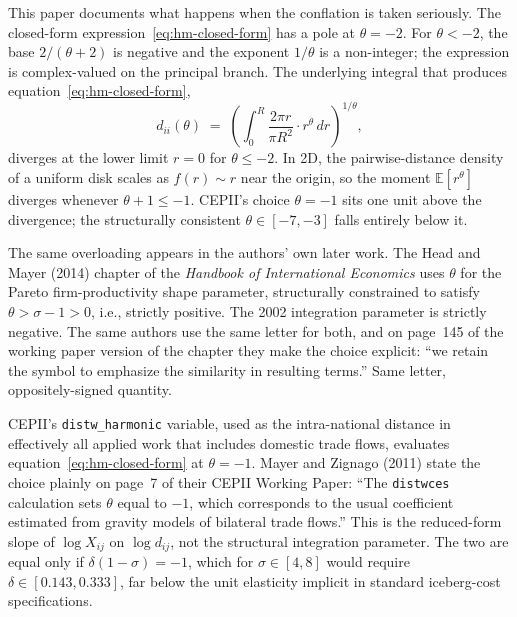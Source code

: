 \documentclass[11pt, letterpaper]{article}
\theoremstyle{definition}
\newcommand{\E}{\mathbb{E}}
\newcommand{\dii}{d_{ii}}
\begin{document}
This paper documents what happens when the conflation is taken
seriously. The closed-form expression~\eqref{eq:hm-closed-form} has a
pole at $\theta = -2$. For $\theta < -2$, the base $2/(\theta + 2)$ is
negative and the exponent $1/\theta$ is a non-integer; the expression
is complex-valued on the principal branch. The underlying integral
that produces equation~\eqref{eq:hm-closed-form},
\begin{equation}
\label{eq:hm-integral}
\dii(\theta) \;=\; \left( \int_0^R \frac{2\pi r}{\pi R^2} \cdot r^{\theta}\, dr \right)^{1/\theta},
\end{equation}
diverges at the lower limit $r = 0$ for $\theta \leq -2$. In 2D, the
pairwise-distance density of a uniform disk scales as $f(r) \sim r$
near the origin, so the moment $\E[r^\theta]$ diverges whenever
$\theta + 1 \leq -1$. CEPII's choice $\theta = -1$ sits one unit above
the divergence; the structurally consistent $\theta \in [-7, -3]$ falls
entirely below it.

The same overloading appears in the authors' own later work. The
Head and Mayer (2014) chapter of the \emph{Handbook of International
Economics} uses $\theta$ for the Pareto firm-productivity shape
parameter, structurally constrained to satisfy $\theta > \sigma - 1 > 0$,
i.e., strictly positive. The 2002 integration parameter is strictly
negative. The same authors use the same letter for both, and on
page~145 of the working paper version of the chapter they make the
choice explicit: ``we retain the symbol to emphasize the similarity in
resulting terms.'' Same letter, oppositely-signed quantity.

CEPII's \texttt{distw\_harmonic} variable, used as the intra-national
distance in effectively all applied work that includes domestic trade
flows, evaluates equation~\eqref{eq:hm-closed-form} at $\theta = -1$.
Mayer and Zignago (2011) state the choice plainly on page~7 of their
CEPII Working Paper: ``The \texttt{distwces} calculation sets $\theta$
equal to $-1$, which corresponds to the usual coefficient estimated
from gravity models of bilateral trade flows.'' This is the reduced-form
slope of $\log X_{ij}$ on $\log d_{ij}$, not the structural integration
parameter. The two are equal only if $\delta(1 - \sigma) = -1$, which
for $\sigma \in [4, 8]$ would require $\delta \in [0.143, 0.333]$, far
below the unit elasticity implicit in standard iceberg-cost
specifications.
\end{document}
